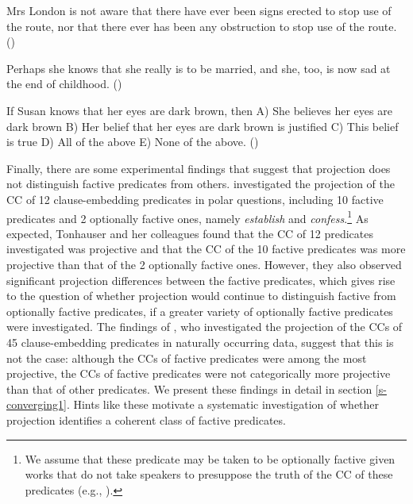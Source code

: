 \documentclass[11pt,fleqn]{article}
\newcommand{\6}{\mbox{$[\hspace*{-.6mm}[$}}
\newcommand{\9}{\mbox{$]\hspace*{-.6mm}]$}}
\begin{document}
\begin{exe}
\ex\label{nat2}

\begin{xlist}

\ex Mrs London is not aware that there have ever been signs erected to stop use of the route, nor that there ever has been  any obstruction to stop use of the route. \hfill (\citealt[83]{beaver-belly})

\ex Perhaps she knows that she really is to be married, and she, too, is now sad at the end of childhood. \hfill (\citealt[86]{beaver-belly})

\ex If Susan knows that her eyes are dark brown, then A) She believes her eyes are dark brown B) Her belief that her eyes are dark brown is justified C) This belief is true D) All of the above E) None of the above. \hfill (\citealt[84]{beaver-belly})

\end{xlist}
\end{exe}

Finally, there are some experimental findings that suggest that projection does not distinguish factive predicates from others. \citealt{tbd-variability} investigated the projection of the CC of 12 clause-embedding predicates in polar questions, including 10 factive predicates and 2 optionally factive ones, namely {\em establish} and {\em confess}.\footnote{We assume that these predicate may be taken to be optionally factive given works that do not take speakers to presuppose the truth of the CC of these predicates (e.g., \citealt{wyse,swanson2012,karttunen2016}).} As expected, Tonhauser and her colleagues found that the CC of 12 predicates investigated was projective and that the CC of the 10 factive predicates was more projective than that of the 2 optionally factive ones. However, they also observed significant projection differences between the factive predicates, which gives rise to the question of whether projection would continue to distinguish factive from optionally factive predicates, if a greater variety of optionally factive predicates were investigated. The findings of \citealt{demarneffe-etal-sub23}, who investigated the projection of the CCs of 45 clause-embedding predicates in naturally occurring data, suggest that this is not the case: although the CCs of factive predicates were among the most projective, the CCs of factive predicates were not categorically more projective than that of other predicates. We present these findings in detail in section \ref{s-converging1}. Hints like these motivate a systematic investigation of whether projection identifies a coherent class of factive predicates.
\end{document}
